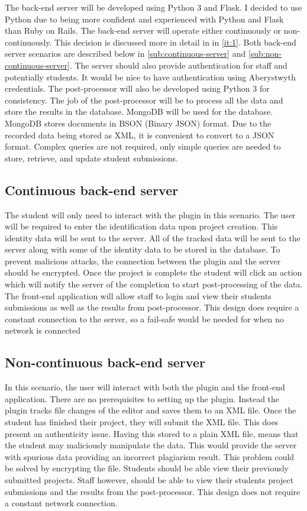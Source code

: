 The back-end server will be developed using Python 3 and Flask. I decided to use Python due to being more confident and experienced with Python and Flask than Ruby on Rails. The back-end server will operate either continuously or non-continuously. This decision is discussed more in detail in  in \autoref{it:1}. Both back-end server scenarios are described below in \autoref{sub:continuous-server} and \autoref{sub:non-continuous-server}. The server should also provide authentication for staff and potentially students. It would be nice to have authentication using Aberystwyth credentials. The post-processor will also be developed using Python 3 for consistency. The job of the post-processor will be to process all the data and store the results in the database. MongoDB will be used for the database. MongoDB stores documents in BSON (Binary JSON) format. Due to the recorded data being stored as XML, it is convenient to convert to a JSON format. Complex queries are not required, only simple queries are needed to store, retrieve, and update student submissions.

\subsection{Continuous back-end server}
\label{sub:continuous-server}
The student will only need to interact with the plugin in this scenario. The user will be required to enter the identification data upon project creation. This identity data will be sent to the server. All of the tracked data will be sent to the server along with some of the identity data to be stored in the database. To prevent malicious attacks, the connection between the plugin and the server should be encrypted. Once the project is complete the student will click an action which will notify the server of the completion to start post-processing of the data. The front-end application will allow staff to login and view their students submissions as well as the results from post-processor. This design does require a constant connection to the server, so a fail-safe would be needed for when no network is connected

\subsection{Non-continuous back-end server}
\label{sub:non-continuous-server}
In this scenario, the user will interact with both the plugin and the front-end application. There are no prerequisites to setting up the plugin. Instead the plugin tracks file changes of the editor and saves them to an XML file. Once the student has finished their project, they will submit the XML file. This does present an authenticity issue. Having this stored to a plain XML file, means that the student may maliciously manipulate the data. This would provide the server with spurious data providing an incorrect plagiarism result. This problem could be solved by encrypting the file. Students should be able view their previously submitted projects. Staff however, should be able to view their students project submissions and the results from the post-processor. This design does not require a constant network connection.

